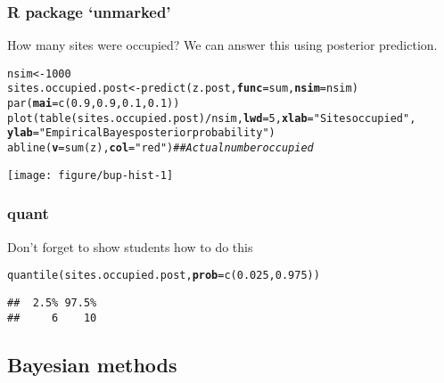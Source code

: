 \documentclass[color=usenames,dvipsnames]{beamer}\usepackage[]{graphicx}\usepackage[]{color}
\makeatletter
\newcommand{\hlnum}[1]{\textcolor[rgb]{0.69,0.494,0}{#1}}%
\newcommand{\hlstr}[1]{\textcolor[rgb]{0.749,0.012,0.012}{#1}}%
\newcommand{\hlcom}[1]{\textcolor[rgb]{0.514,0.506,0.514}{\textit{#1}}}%
\newcommand{\hlopt}[1]{\textcolor[rgb]{0,0,0}{#1}}%
\newcommand{\hlstd}[1]{\textcolor[rgb]{0,0,0}{#1}}%
\newcommand{\hlkwb}[1]{\textcolor[rgb]{0,0.341,0.682}{#1}}%
\newcommand{\hlkwc}[1]{\textcolor[rgb]{0,0,0}{\textbf{#1}}}%
\newcommand{\hlkwd}[1]{\textcolor[rgb]{0.004,0.004,0.506}{#1}}%
\newenvironment{kframe}{%
 \def\at@end@of@kframe{}%
 \ifinner\ifhmode%
  \def\at@end@of@kframe{\end{minipage}}%
  \begin{minipage}{\columnwidth}%
 \fi\fi%
 \def\FrameCommand##1{\hskip\@totalleftmargin \hskip-\fboxsep
 \colorbox{shadecolor}{##1}\hskip-\fboxsep
     \hskip-\linewidth \hskip-\@totalleftmargin \hskip\columnwidth}%
 \MakeFramed {\advance\hsize-\width
   \@totalleftmargin\z@ \linewidth\hsize
   \@setminipage}}%
 {\par\unskip\endMakeFramed%
 \at@end@of@kframe}
\newenvironment{knitrout}{}{} %
\makeatother
\begin{document}
\begin{frame}[fragile]
  \frametitle{R package `unmarked'}
  How many sites were occupied? \pause
  We can answer this using posterior prediction.
\begin{knitrout}\tiny
{}\color{fgcolor}\begin{kframe}
\begin{alltt}
\hlstd{nsim} \hlkwb{<-} \hlnum{1000}
\hlstd{sites.occupied.post} \hlkwb{<-} \hlkwd{predict}\hlstd{(z.post,} \hlkwc{func}\hlstd{=sum,} \hlkwc{nsim}\hlstd{=nsim)}
\hlkwd{par}\hlstd{(}\hlkwc{mai}\hlstd{=}\hlkwd{c}\hlstd{(}\hlnum{0.9}\hlstd{,}\hlnum{0.9}\hlstd{,}\hlnum{0.1}\hlstd{,}\hlnum{0.1}\hlstd{))}
\hlkwd{plot}\hlstd{(}\hlkwd{table}\hlstd{(sites.occupied.post)}\hlopt{/}\hlstd{nsim,} \hlkwc{lwd}\hlstd{=}\hlnum{5}\hlstd{,} \hlkwc{xlab}\hlstd{=}\hlstr{"Sites occupied"}\hlstd{,}
    \hlkwc{ylab}\hlstd{=}\hlstr{"Empirical Bayes posterior probability"}\hlstd{)}
\hlkwd{abline}\hlstd{(}\hlkwc{v}\hlstd{=}\hlkwd{sum}\hlstd{(z),} \hlkwc{col}\hlstd{=}\hlstr{"red"}\hlstd{)} \hlcom{## Actual number occupied}
\end{alltt}
\end{kframe}

{\centering \texttt{[image: figure/bup-hist-1]} 

}


\end{knitrout}
\end{frame}



\begin{frame}[fragile]
  \frametitle{quant}
  Don't forget to show students how to do this
\begin{knitrout}
\color{fgcolor}\begin{kframe}
\begin{alltt}
\hlkwd{quantile}\hlstd{(sites.occupied.post,} \hlkwc{prob}\hlstd{=}\hlkwd{c}\hlstd{(}\hlnum{0.025}\hlstd{,} \hlnum{0.975}\hlstd{))}
\end{alltt}
\begin{verbatim}
##  2.5% 97.5% 
##     6    10
\end{verbatim}
\end{kframe}
\end{knitrout}
\end{frame}



\subsection{Bayesian methods}
\end{document}
